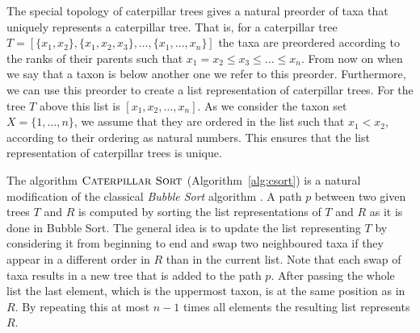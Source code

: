 \documentclass{amsart}
\newcommand{\nni}{\mathrm{NNI}}
\newcommand{\rnni}{\mathrm{RNNI}}
\newcommand{\csort}{\textsc{Caterpillar Sort}}
\begin{document}
The special topology of caterpillar trees gives a natural preorder of taxa that uniquely represents a caterpillar tree.
That is, for a caterpillar tree $T = [\{x_1, x_2\}, \{x_1, x_2, x_3\}, \ldots, \{x_1, \ldots, x_n\}]$ the taxa are preordered according to the ranks of their parents such that $x_1 = x_2 \leq x_3 \leq \ldots \leq x_n$.
From now on when we say that a taxon is below another one we refer to this preorder.
Furthermore, we can use this preorder to create a list representation of caterpillar trees.
For the tree $T$ above this list is $[x_1, x_2, \ldots, x_n]$.
As we consider the taxon set $X = \{1, \ldots, n\}$, we assume that they are ordered in the list such that $x_1 < x_2$, according to their ordering as natural numbers.
This ensures that the list representation of caterpillar trees is unique.


The algorithm $\csort$ (Algorithm~\ref{alg:csort}) is a natural modification of the classical \emph{Bubble Sort} algorithm \autocite{Knuth1997-pi}.
A path $p$ between two given trees $T$ and $R$ is computed by sorting the list representations of $T$ and $R$ as it is done in Bubble Sort.
The general idea is to update the list representing $T$ by considering it from beginning to end and swap two neighboured taxa if they appear in a different order in $R$ than in the current list.
Note that each swap of taxa results in a new tree that is added to the path $p$.
After passing the whole list the last element, which is the uppermost taxon, is at the same position as in $R$.
By repeating this at most $n-1$ times all elements the resulting list represents $R$.
\end{document}
